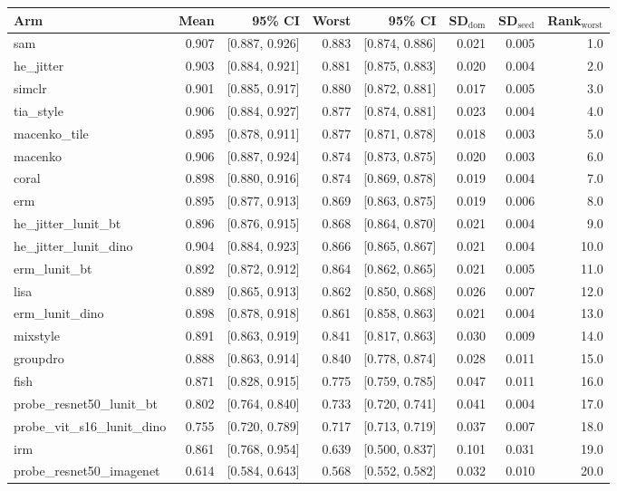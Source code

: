 \begin{tabular}{lrrrrrrr}
\toprule
Arm & Mean & 95\% CI & Worst & 95\% CI & SD$_\text{dom}$ & SD$_\text{seed}$ & Rank$_\text{worst}$ \\
\midrule
sam & 0.907 & [0.887, 0.926] & 0.883 & [0.874, 0.886] & 0.021 & 0.005 & 1.0 \\
he\_jitter & 0.903 & [0.884, 0.921] & 0.881 & [0.875, 0.883] & 0.020 & 0.004 & 2.0 \\
simclr & 0.901 & [0.885, 0.917] & 0.880 & [0.872, 0.881] & 0.017 & 0.005 & 3.0 \\
tia\_style & 0.906 & [0.884, 0.927] & 0.877 & [0.874, 0.881] & 0.023 & 0.004 & 4.0 \\
macenko\_tile & 0.895 & [0.878, 0.911] & 0.877 & [0.871, 0.878] & 0.018 & 0.003 & 5.0 \\
macenko & 0.906 & [0.887, 0.924] & 0.874 & [0.873, 0.875] & 0.020 & 0.003 & 6.0 \\
coral & 0.898 & [0.880, 0.916] & 0.874 & [0.869, 0.878] & 0.019 & 0.004 & 7.0 \\
erm & 0.895 & [0.877, 0.913] & 0.869 & [0.863, 0.875] & 0.019 & 0.006 & 8.0 \\
he\_jitter\_lunit\_bt & 0.896 & [0.876, 0.915] & 0.868 & [0.864, 0.870] & 0.021 & 0.004 & 9.0 \\
he\_jitter\_lunit\_dino & 0.904 & [0.884, 0.923] & 0.866 & [0.865, 0.867] & 0.021 & 0.004 & 10.0 \\
erm\_lunit\_bt & 0.892 & [0.872, 0.912] & 0.864 & [0.862, 0.865] & 0.021 & 0.005 & 11.0 \\
lisa & 0.889 & [0.865, 0.913] & 0.862 & [0.850, 0.868] & 0.026 & 0.007 & 12.0 \\
erm\_lunit\_dino & 0.898 & [0.878, 0.918] & 0.861 & [0.858, 0.863] & 0.021 & 0.004 & 13.0 \\
mixstyle & 0.891 & [0.863, 0.919] & 0.841 & [0.817, 0.863] & 0.030 & 0.009 & 14.0 \\
groupdro & 0.888 & [0.863, 0.914] & 0.840 & [0.778, 0.874] & 0.028 & 0.011 & 15.0 \\
fish & 0.871 & [0.828, 0.915] & 0.775 & [0.759, 0.785] & 0.047 & 0.011 & 16.0 \\
probe\_resnet50\_lunit\_bt & 0.802 & [0.764, 0.840] & 0.733 & [0.720, 0.741] & 0.041 & 0.004 & 17.0 \\
probe\_vit\_s16\_lunit\_dino & 0.755 & [0.720, 0.789] & 0.717 & [0.713, 0.719] & 0.037 & 0.007 & 18.0 \\
irm & 0.861 & [0.768, 0.954] & 0.639 & [0.500, 0.837] & 0.101 & 0.031 & 19.0 \\
probe\_resnet50\_imagenet & 0.614 & [0.584, 0.643] & 0.568 & [0.552, 0.582] & 0.032 & 0.010 & 20.0 \\
\bottomrule
\end{tabular}
